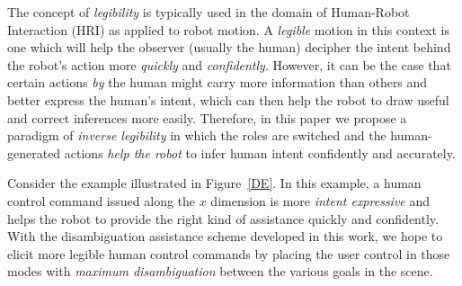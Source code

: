 \documentclass[conference]{IEEEtran}
\begin{document}
The concept of \textit{legibility} is typically used in the domain of Human-Robot Interaction (HRI) as applied to robot motion. A \textit{legible} motion in this context is one which will help the observer (usually the human) decipher the intent behind the robot's action more \textit{quickly} and \textit{confidently}. However, it can be the case that certain actions \textit{by} the human might carry more information than others and better express the human's intent, which can then help the robot to draw useful and correct inferences more easily. Therefore, in this paper we propose a paradigm of \textit{inverse legibility} in which the roles are switched and the human-generated actions \textit{help the robot} to infer human intent confidently and accurately. 

Consider the example illustrated in Figure~\ref{DE}. In this example, a human control command issued along the $x$ dimension is more \textit{intent expressive} and helps the robot to provide the right kind of assistance quickly and confidently. With the disambiguation assistance scheme developed in this work, we hope to elicit more legible human control commands by placing the user control in those modes with \textit{maximum disambiguation} between the various goals in the scene. 

\end{document}
